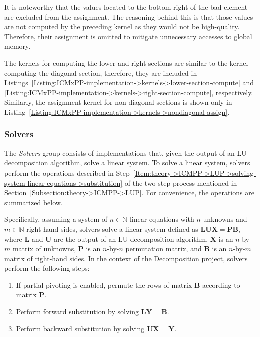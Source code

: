 It is noteworthy that the values located to the bottom-right of the bad element are excluded from the assignment.
The reasoning behind this is that those values are not computed by the preceding kernel as they would not be high-quality.
Therefore, their assignment is omitted to mitigate unnecessary accesses to global memory.

The kernels for computing the lower and right sections are similar to the kernel computing the diagonal section, therefore, they are included in Listings~\ref{Listing:ICMxPP-implementation->kernels->lower-section-compute} and \ref{Listing:ICMxPP-implementation->kernels->right-section-compute}, respectively.
Similarly, the assignment kernel for non-diagonal sections is shown only in Listing~\ref{Listing:ICMxPP-implementation->kernels->nondiagonal-assign}.

\subsubsection{Solvers}\label{Subsection:implementation->decomposition-project->implemented-solutions->solvers}
The \textit{Solvers} group consists of implementations that, given the output of an LU decomposition algorithm, solve a linear system.
To solve a linear system, solvers perform the operations described in Step~\ref{Item:theory->ICMPP->LUP->solving-system-linear-equations->substitution} of the two-step process mentioned in Section~\ref{Subsection:theory->ICMPP->LUP}.
For convenience, the operations are summarized below.

Specifically, assuming a system of $n \in \mathbb{N}$ linear equations with $n$ unknowns and $m \in \mathbb{N}$ right-hand sides, solvers solve a linear system defined as $\mathbf{LUX} = \mathbf{PB}$, where $\mathbf{L}$ and $\mathbf{U}$ are the output of an LU decomposition algorithm, $\mathbf{X}$ is an $n$-by-$m$ matrix of unknowns, $\mathbf{P}$ is an $n$-by-$n$ permutation matrix, and $\mathbf{B}$ is an $n$-by-$m$ matrix of right-hand sides.
In the context of the Decomposition project, solvers perform the following steps:

\begin{enumerate}
	\item If partial pivoting is enabled, permute the rows of matrix $\mathbf{B}$ according to matrix $\mathbf{P}$.
	\item \label{Item:implementation->decomposition-project->implemented-solutions->solvers->forward-substitution}
		Perform forward substitution by solving $\mathbf{LY} = \mathbf{B}$.
	\item \label{Item:implementation->decomposition-project->implemented-solutions->solvers->backward-substitution}
		Perform backward substitution by solving $\mathbf{UX} = \mathbf{Y}$.
\end{enumerate}

